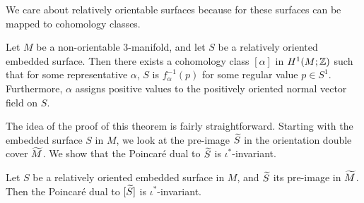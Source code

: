 We care about relatively orientable surfaces because for these surfaces can be mapped to cohomology classes.
\begin{thm}
  \label{thm:Poincare-duality}
  Let $M$ be a non-orientable $3$-manifold, and let $S$ be a relatively oriented embedded
  surface. Then there exists a cohomology class $[\alpha]$ in $H^1(M; \mathbb{Z})$ such that for some
  representative $\alpha$, $S$ is $f_{\alpha}^{-1}(p)$ for some regular value $p \in
  S^1$. Furthermore, $\alpha$ assigns positive values to the positively oriented normal vector
  field on $S$.
\end{thm}

The idea of the proof of this theorem is fairly straightforward. Starting with the embedded surface
$S$ in $M$, we look at the pre-image $\widetilde{S}$ in the orientation double cover $\widetilde{M}$. We show
that the Poincar\'e dual to $\widetilde{S}$ is $\iota^{\ast}$-invariant.
\begin{lem}
  \label{lem:PD1}
  Let $S$ be a relatively oriented embedded surface in $M$, and $\widetilde{S}$ its pre-image in
  $\widetilde{M}$. Then the Poincar\'e dual to $[\widetilde{S}]$ is $\iota^{\ast}$-invariant.
\end{lem}
